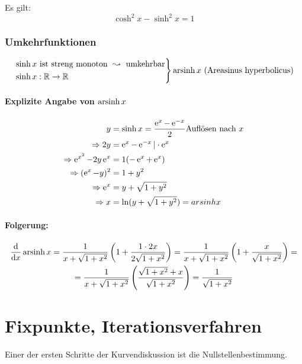 
Es gilt:
\begin{equation*}
	\cosh^2 x - \sinh^2 x = 1
\end{equation*}

\subsubsection{Umkehrfunktionen}

\begin{equation*}
	\left.
	\begin{aligned}
		&\sinh x \text{ ist streng monoton } \leadsto \text{ umkehrbar} \\
		&\sinh x : \mathbb{R} \rightarrow \mathbb{R}
	\end{aligned}
	\right\} \operatorname{arsinh} x \text{ (Areasinus hyperbolicus)}
\end{equation*}

\paragraph{Explizite Angabe von $\operatorname{arsinh} x$}
\begin{align*}
	y &= \sinh x = \frac{\operatorname{e}^x - \operatorname{e}^{-x}}{2} \text{Auflösen nach $x$}\\
	\Rightarrow 2y &= \operatorname{e}^x - \operatorname{e}^{-x} | \cdot \operatorname{e}^x \\
	\Rightarrow \operatorname{e}^{x^2} - 2y\operatorname{e}^x &= 1(-\operatorname{e}^x + \operatorname{e}^x) \\
	\Rightarrow (\operatorname{e}^x - y)^2 &= 1 + y^2 \\
	\Rightarrow \operatorname{e}^x &= y + \sqrt{1 + y^2} \\
	\Rightarrow x &= \ln (y + \sqrt{1 + y^2}) = arsinh x
\end{align*}

\paragraph{Folgerung: }
\begin{multline*}
	\frac{\mathrm d}{\mathrm d x} \operatorname{arsinh} x = \frac{1}{x + \sqrt{1 + x^2}}\left(1 + \frac{1 \cdot 2x}{2\sqrt{1 + x^2}}\right) = \frac{1}{x + \sqrt{1 + x^2}} \left(1 + \frac{x}{\sqrt{1 + x^2}} \right) = \\
	= \frac{1}{x + \sqrt{1 + x^2}} \left(\frac{\sqrt{1 + x^2} + x}{\sqrt{1 + x^2}}\right) = \frac{1}{\sqrt{1 + x^2}}
\end{multline*}

\section{Fixpunkte, Iterationsverfahren}
Einer der ersten Schritte der Kurvendiskussion ist die Nullstellenbestimmung.

